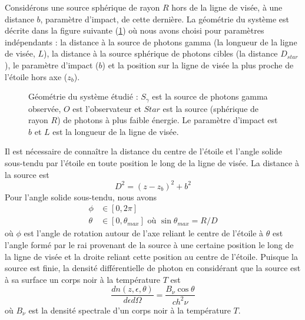 \documentclass[a4paper,12pt,twoside]{article}
\begin{document}
Considérons une source sphérique de rayon $R$ hors de la ligne de visée, à une distance $b$, paramètre d'impact, de cette dernière. La géométrie du système est décrite dans la figure suivante (\ref{fig: source spherique}) où nous avons choisi pour paramètres indépendants : la distance à la source de photons gamma (la longueur de la ligne de visée, $L$), la distance à la source sphérique de photons cibles (la distance $D_{star}$), le paramètre d'impact ($b$) et la position sur la ligne de visée la plus proche de l'étoile hors axe ($z_b$).

\begin{figure}[H]
	\centering
    \caption{Géométrie du système étudié : $S_\gamma$ est la source de photons gamma observée, $O$ est l'observateur et $Star$ est la source (sphérique de rayon $R$) de photons à plus faible énergie. Le paramètre d'impact est $b$ et $L$ est la longueur de la ligne de visée.}
        \label{fig: source spherique}
\end{figure}
Il est nécessaire de connaître la distance du centre de l'étoile et l'angle solide sous-tendu par l'étoile en toute position le long de la ligne de visée. La distance à la source est
\begin{equation*}
	D^2 = (z - z_b)^2 + b^2
\end{equation*}
Pour l'angle solide sous-tendu, nous avons
\begin{align*}
	\phi &\in [0, 2\pi]\\
    \theta &\in [0, \theta_{max}] \text{ où } \sin\theta_{max} = R/D
\end{align*}
où $\phi$ est l'angle de rotation autour de l'axe reliant le centre de l'étoile à  $\theta$ est l'angle formé par le rai provenant de la source à une certaine position le long de la ligne de visée et la droite reliant cette position au centre de l'étoile.
Puisque la source est finie, la densité différentielle de photon en considérant que la source est à sa surface un corps noir à la température $T$ est
\begin{equation}
	\frac{d n (z, \epsilon, \theta)}{d \epsilon d \Omega} = \frac{B_\nu \cos\theta}{c h^2 \nu}
    \label{eq: densite anisotrope}
\end{equation}
où $B_\nu$ est la densité spectrale d'un corps noir à la température $T$.
\end{document}
